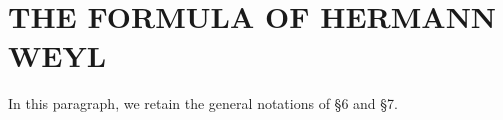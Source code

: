 \section{THE FORMULA OF HERMANN WEYL}

In this paragraph, we retain the general notations of §6 and §7.

